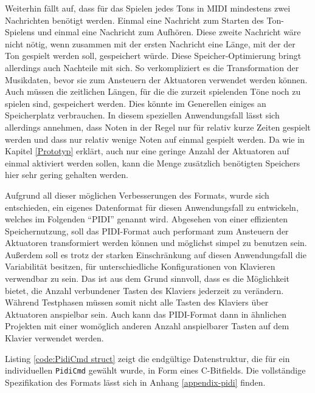 Weiterhin fällt auf, dass für das Spielen jedes Tons in \ac{MIDI} mindestens zwei Nachrichten benötigt werden.
Einmal eine Nachricht zum Starten des Ton-Spielens und einmal eine Nachricht zum Aufhören.
Diese zweite Nachricht wäre nicht nötig, wenn zusammen mit der ersten Nachricht eine Länge, mit der der Ton gespielt werden soll, gespeichert würde.
Diese Speicher-Optimierung bringt allerdings auch Nachteile mit sich.
So verkompliziert es die Transformation der Musikdaten, bevor sie zum Ansteuern der Aktuatoren verwendet werden können.
Auch müssen die zeitlichen Längen, für die die zurzeit spielenden Töne noch zu spielen sind, gespeichert werden.
Dies könnte im Generellen einiges an Speicherplatz verbrauchen.
In diesem speziellen Anwendungsfall lässt sich allerdings annehmen, dass Noten in der Regel nur für relativ kurze Zeiten gespielt werden und dass nur relativ wenige Noten auf einmal gespielt werden.
Da wie in Kapitel \ref{Prototyp} erklärt, auch nur eine geringe Anzahl der Aktuatoren auf einmal aktiviert werden sollen, kann die Menge zusätzlich benötigten Speichers hier sehr gering gehalten werden.

Aufgrund all dieser möglichen Verbesserungen des Formats, wurde sich entschieden, ein eigenes Datenformat für diesen Anwendungsfall zu entwickeln, welches im Folgenden \enquote{\ac{PIDI}} genannt wird.
Abgesehen von einer effizienten Speichernutzung, soll das \ac{PIDI}-Format auch performant zum Ansteuern der Aktuatoren transformiert werden können und möglichst simpel zu benutzen sein.
Außerdem soll es trotz der starken Einschränkung auf diesen Anwendungsfall die Variabilität besitzen, für unterschiedliche Konfigurationen von Klavieren verwendbar zu sein.
Das ist aus dem Grund sinnvoll, dass es die Möglichkeit bietet, die Anzahl verbundener Tasten des Klaviers jederzeit zu verändern.
Während Testphasen müssen somit nicht alle Tasten des Klaviers über Aktuatoren anspielbar sein.
Auch kann das \ac{PIDI}-Format dann in ähnlichen Projekten mit einer womöglich anderen Anzahl anspielbarer Tasten auf dem Klavier verwendet werden.

Listing \ref{code:PidiCmd struct} zeigt die endgültige Datenstruktur, die für ein individuellen \lstinline{PidiCmd} gewählt wurde, in Form eines C-Bitfields.
Die vollständige Spezifikation des Formats lässt sich in Anhang \ref{appendix-pidi} finden.


